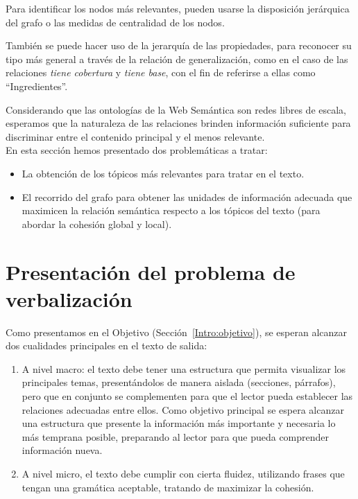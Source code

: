 Para identificar los nodos más relevantes, pueden usarse la disposición jerárquica del grafo o las medidas de centralidad de los nodos.

También se puede hacer uso de la jerarquía de las propiedades, para reconocer su tipo más general a través de la relación de generalización, como en el caso de las relaciones \emph{tiene cobertura} y \emph{tiene base}, con el fin de referirse a ellas como ``Ingredientes''.

Considerando que las ontologías de la Web Semántica son redes libres de escala, esperamos que la naturaleza de las relaciones brinden información suficiente para discriminar entre el contenido principal y el menos relevante.
\\

En esta sección hemos presentado dos problemáticas a tratar:

\begin{itemize}
    \item La obtención de los tópicos más relevantes para tratar en el texto.%
    \item El recorrido del grafo para obtener las unidades de información adecuada que maximicen la relación semántica respecto a los tópicos del texto (para abordar la cohesión global y local).%
\end{itemize}

 
\section{Presentación del problema de verbalización}
Como presentamos en el Objetivo (Sección~\ref{Intro:objetivo}), se esperan alcanzar dos cualidades principales en el texto de salida:
\begin{enumerate}
    \item A nivel macro: el texto debe tener una estructura que permita visualizar los principales temas, presentándolos de manera aislada (secciones, párrafos), pero que en conjunto se complementen para que el lector pueda establecer las relaciones adecuadas entre ellos. Como objetivo principal se espera alcanzar una estructura que presente la información más importante y necesaria lo más temprana posible, preparando al lector para que pueda comprender información nueva.
    \item A nivel micro, el texto debe cumplir con cierta fluidez, utilizando frases que tengan una gramática aceptable, tratando de maximizar la cohesión.
\end{enumerate}